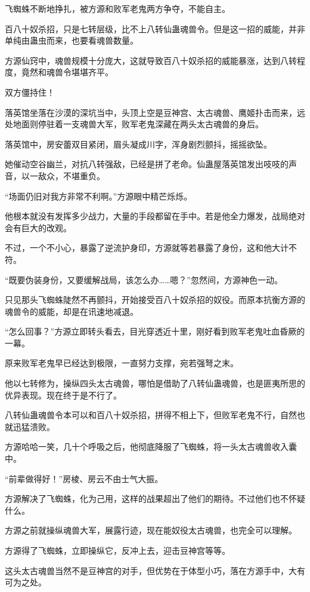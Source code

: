 \begin{this_body}
飞蜘蛛不断地挣扎，被方源和败军老鬼两方争夺，不能自主。

百八十奴杀招，只是七转层级，比不上八转仙蛊魂兽令。但是这一招的威能，并非单纯由蛊虫而来，也要看魂兽数量。

方源仙窍中，魂兽规模十分庞大，这就导致百八十奴杀招的威能暴涨，达到八转程度，竟然和魂兽令堪堪齐平。

双方僵持住！

落英馆坐落在沙漠的深坑当中，头顶上空是豆神宫、太古魂兽、鹰姬扑击而来，远处地面则停驻着一支魂兽大军，败军老鬼深藏在两头太古魂兽的身后。

落英馆中，房安蕾双目紧闭，眉头凝成川字，浑身剧烈颤抖，摇摇欲坠。

她催动空谷幽兰，对抗八转强敌，已经是拼了老命。仙蛊屋落英馆发出吱吱的声音，以一敌众，不堪重负。

“场面仍旧对我方非常不利啊。”方源眼中精芒烁烁。

他根本就没有发挥多少战力，大量的手段都留在手中。若是他全力爆发，战局绝对会有巨大的改观。

不过，一个不小心，暴露了逆流护身印，方源就等若暴露了身份，这和他大计不符。

“既要伪装身份，又要缓解战局，该怎么办……嗯？”忽然间，方源神色一动。

只见那头飞蜘蛛陡然不再颤抖，开始接受百八十奴杀招的奴役。而原本抗衡方源的魂兽令的威能，却是在讯速地减退。

“怎么回事？”方源立即转头看去，目光穿透近十里，刚好看到败军老鬼吐血昏厥的一幕。

原来败军老鬼早已经达到极限，一直努力支撑，宛若强弩之末。

他以七转修为，操纵四头太古魂兽，哪怕是借助了八转仙蛊魂兽，也是匪夷所思的优异表现。现在终于是不行了。

八转仙蛊魂兽令本可以和百八十奴杀招，拼得不相上下，但败军老鬼不行，自然也就迅猛溃败。

方源哈哈一笑，几十个呼吸之后，他彻底降服了飞蜘蛛，将一头太古魂兽收入囊中。

“前辈做得好！”房棱、房云不由士气大振。

方源解决了飞蜘蛛，化为己用，这样的战果超出了他们的期待。不过他们也不怀疑什么。

方源之前就操纵魂兽大军，展露行迹，现在能奴役太古魂兽，也完全可以理解。

方源得了飞蜘蛛，立即操纵它，反冲上去，迎击豆神宫等等。

这头太古魂兽当然不是豆神宫的对手，但优势在于体型小巧，落在方源手中，大有可为之处。


\end{this_body}
